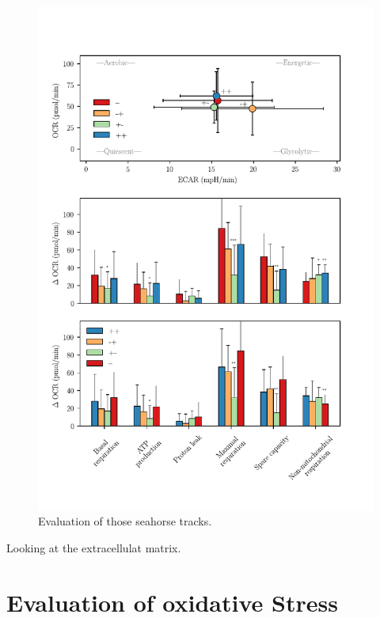     \begin{figure}[htbp]
    \capstart
        \centering
    	\includegraphics{Abbildung/seaborn_energy_profiles.pdf}

    	\begin{minipage}{\captionwidth}
    		\caption[energy_profile]{ \newline Evaluation of those seahorse tracks.}
    		\label{fig:energy_profile}
    	\end{minipage}
    \end{figure}

    Looking at the extracellulat matrix.

\section{Evaluation of oxidative Stress}
\label{sec:oxStress}

